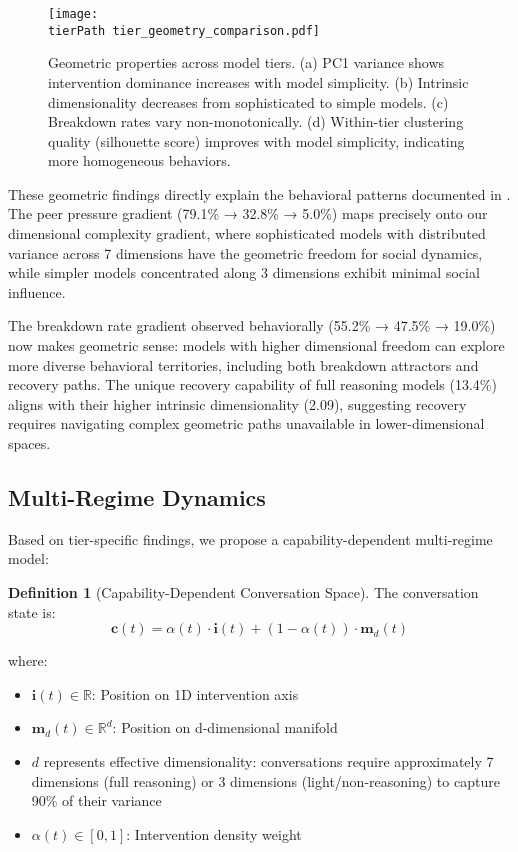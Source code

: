 \documentclass[11pt,letterpaper]{article}
\newcommand{\fullReasoningIntrinsicDim}{2.09}
\newcommand{\fullReasoningPCANinety}{7}
\newcommand{\noReasoningPCANinety}{3}
\newcommand{\fullReasoningPeerPressure}{79.1\%}
\newcommand{\lightReasoningPeerPressure}{32.8\%}
\newcommand{\nonReasoningPeerPressure}{5.0\%}
\newcommand{\fullReasoningBreakdown}{55.2\%}
\newcommand{\lightReasoningBreakdown}{47.5\%}
\newcommand{\nonReasoningBreakdown}{19.0\%}
\newcommand{\fullReasoningRecovery}{13.4\%}
\newcommand{\tierPath}{../analysis/analysis_outputs/tier_analysis/}
\begin{document}
\begin{figure}[htbp]
\centering
\texttt{[image: \\tierPath tier\_geometry\_comparison.pdf]}
\caption{Geometric properties across model tiers. (a) PC1 variance shows intervention dominance increases with model simplicity. (b) Intrinsic dimensionality decreases from sophisticated to simple models. (c) Breakdown rates vary non-monotonically. (d) Within-tier clustering quality (silhouette score) improves with model simplicity, indicating more homogeneous behaviors.}
\label{fig:tier_comparison}
\end{figure}

These geometric findings directly explain the behavioral patterns documented in \citep{garcia2025peer}. The peer pressure gradient (\fullReasoningPeerPressure{} → \lightReasoningPeerPressure{} → \nonReasoningPeerPressure{}) maps precisely onto our dimensional complexity gradient, where sophisticated models with distributed variance across 7 dimensions have the geometric freedom for social dynamics, while simpler models concentrated along 3 dimensions exhibit minimal social influence.


The breakdown rate gradient observed behaviorally (\fullReasoningBreakdown{} → \lightReasoningBreakdown{} → \nonReasoningBreakdown{}) now makes geometric sense: models with higher dimensional freedom can explore more diverse behavioral territories, including both breakdown attractors and recovery paths. The unique recovery capability of full reasoning models (\fullReasoningRecovery{}) aligns with their higher intrinsic dimensionality (\fullReasoningIntrinsicDim{}), suggesting recovery requires navigating complex geometric paths unavailable in lower-dimensional spaces.


\subsection{Multi-Regime Dynamics}

Based on tier-specific findings, we propose a capability-dependent multi-regime model:

\textbf{Definition 1} (Capability-Dependent Conversation Space). The conversation state is:
\begin{equation}
\mathbf{c}(t) = \alpha(t) \cdot \mathbf{i}(t) + (1-\alpha(t)) \cdot \mathbf{m}_d(t)
\end{equation}

where:
\begin{itemize}
    \item $\mathbf{i}(t) \in \mathbb{R}$: Position on 1D intervention axis
    \item $\mathbf{m}_d(t) \in \mathbb{R}^d$: Position on d-dimensional manifold
    \item $d$ represents effective dimensionality: conversations require approximately \fullReasoningPCANinety{} dimensions (full reasoning) or \noReasoningPCANinety{} dimensions (light/non-reasoning) to capture 90\% of their variance
    \item $\alpha(t) \in [0,1]$: Intervention density weight
\end{itemize}
\end{document}
